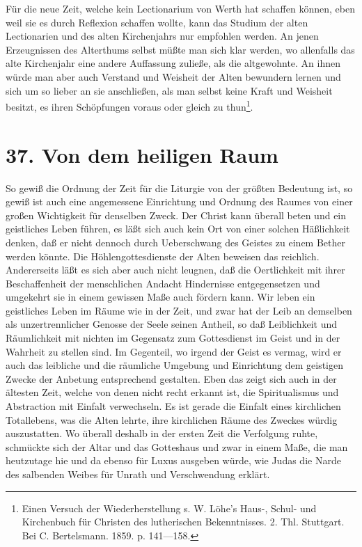 Für die neue Zeit, welche kein Lectionarium von Werth hat schaffen können, eben weil sie es durch Reflexion schaffen
wollte, kann das Studium der alten Lectionarien und des alten Kirchenjahrs nur empfohlen werden. An jenen Erzeugnissen des Alterthums selbst müßte man sich klar werden, wo allenfalls das alte Kirchenjahr eine andere Auffassung zuließe, als die altgewohnte. An ihnen würde man aber auch Verstand und Weisheit der Alten bewundern lernen und sich um so lieber an sie anschließen, als man selbst keine Kraft und Weisheit besitzt, es ihren Schöpfungen voraus oder gleich zu thun\footnote{Einen Versuch der Wiederherstellung s. W. Löhe’s Haus-, Schul- und Kirchenbuch für Christen des lutherischen Bekenntnisses. 2. Thl. Stuttgart. Bei C. Bertelsmann. 1859. p. 141—158.}.

\section{37. Von dem heiligen Raum}

So gewiß die Ordnung der Zeit für die Liturgie von der größten Bedeutung ist, so gewiß ist auch eine angemessene Einrichtung und Ordnung des Raumes von einer großen Wichtigkeit für denselben Zweck. Der Christ kann überall beten und ein geistliches Leben führen, es läßt sich auch kein Ort von einer solchen Häßlichkeit denken, daß er nicht dennoch durch Ueberschwang des Geistes zu einem Bether werden könnte. Die Höhlengottesdienste der Alten beweisen das reichlich. Andererseits läßt es sich aber auch nicht leugnen, daß die Oertlichkeit mit ihrer Beschaffenheit der menschlichen Andacht Hindernisse entgegensetzen und umgekehrt sie in einem gewissen Maße auch fördern kann. Wir leben ein geistliches Leben im
Räume wie in der Zeit, und zwar hat der Leib an demselben als unzertrennlicher Genosse der Seele seinen Antheil, so daß Leiblichkeit und Räumlichkeit mit nichten im Gegensatz zum Gottesdienst im Geist und in der Wahrheit zu stellen sind. Im Gegenteil, wo irgend der Geist es vermag, wird er auch das leibliche und die räumliche Umgebung und Einrichtung dem geistigen Zwecke der Anbetung entsprechend gestalten. Eben das zeigt sich auch in der ältesten Zeit, welche von denen nicht recht erkannt ist, die Spiritualismus und Abstraction mit Einfalt verwechseln. Es ist gerade die Einfalt eines kirchlichen Totallebens, was die Alten lehrte, ihre kirchlichen Räume des Zweckes würdig auszustatten. Wo überall deshalb in der ersten Zeit die Verfolgung ruhte, schmückte sich der Altar und das Gotteshaus und zwar in einem Maße, die man heutzutage hie und da ebenso für Luxus ausgeben würde, wie Judas die Narde des salbenden Weibes für Unrath und Verschwendung erklärt.

